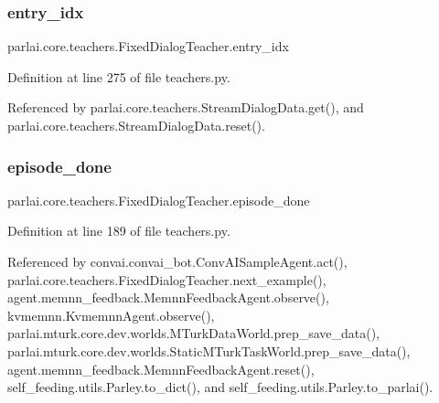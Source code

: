 \subsubsection{\texorpdfstring{entry\+\_\+idx}{entry\_idx}}
{\footnotesize\ttfamily parlai.\+core.\+teachers.\+Fixed\+Dialog\+Teacher.\+entry\+\_\+idx}



Definition at line 275 of file teachers.\+py.



Referenced by parlai.\+core.\+teachers.\+Stream\+Dialog\+Data.\+get(), and parlai.\+core.\+teachers.\+Stream\+Dialog\+Data.\+reset().

\mbox{\label{classparlai_1_1core_1_1teachers_1_1FixedDialogTeacher_a86428affae9471df880dd5e8dc4b90ed}} 
\subsubsection{\texorpdfstring{episode\+\_\+done}{episode\_done}}
{\footnotesize\ttfamily parlai.\+core.\+teachers.\+Fixed\+Dialog\+Teacher.\+episode\+\_\+done}



Definition at line 189 of file teachers.\+py.



Referenced by convai.\+convai\+\_\+bot.\+Conv\+A\+I\+Sample\+Agent.\+act(), parlai.\+core.\+teachers.\+Fixed\+Dialog\+Teacher.\+next\+\_\+example(), agent.\+memnn\+\_\+feedback.\+Memnn\+Feedback\+Agent.\+observe(), kvmemnn.\+Kvmemnn\+Agent.\+observe(), parlai.\+mturk.\+core.\+dev.\+worlds.\+M\+Turk\+Data\+World.\+prep\+\_\+save\+\_\+data(), parlai.\+mturk.\+core.\+dev.\+worlds.\+Static\+M\+Turk\+Task\+World.\+prep\+\_\+save\+\_\+data(), agent.\+memnn\+\_\+feedback.\+Memnn\+Feedback\+Agent.\+reset(), self\+\_\+feeding.\+utils.\+Parley.\+to\+\_\+dict(), and self\+\_\+feeding.\+utils.\+Parley.\+to\+\_\+parlai().

\mbox{\label{classparlai_1_1core_1_1teachers_1_1FixedDialogTeacher_afd4ebab8063eb42d182d30a1a41f133e}} 
